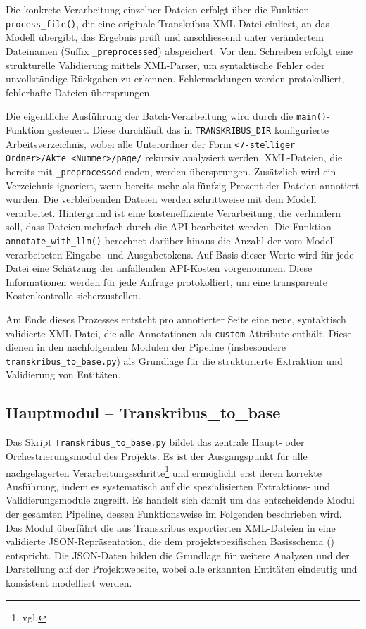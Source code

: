 \documentclass[12pt, a4paper, ngerman, bidi=default]{article}
\newcommand{\code}[1]{\colorbox{VeryLightGray}{\texttt{#1}}} %
\begin{document}
Die konkrete Verarbeitung einzelner Dateien erfolgt über die Funktion \code{process\_file()}, die eine originale Transkribus-XML-Datei einliest,
an das Modell übergibt, das Ergebnis prüft und anschliessend unter verändertem Dateinamen (Suffix \code{\_preprocessed}) abspeichert. Vor dem 
Schreiben erfolgt eine strukturelle Validierung mittels XML-Parser, um syntaktische Fehler oder unvollständige Rückgaben zu 
erkennen. Fehlermeldungen werden protokolliert, fehlerhafte Dateien übersprungen.

Die eigentliche Ausführung der Batch-Verarbeitung wird durch die \code{main()}-Funktion gesteuert. Diese durchläuft das in 
\code{TRANSKRIBUS\_DIR} konfigurierte Arbeitsverzeichnis, wobei alle Unterordner der Form \code{<7-stelliger Ordner>/Akte\_<Nummer>/page/} 
rekursiv analysiert werden. XML-Dateien, die bereits mit \code{\_preprocessed} enden, werden übersprungen. Zusätzlich wird ein Verzeichnis 
ignoriert, wenn bereits mehr als fünfzig Prozent der Dateien annotiert wurden. Die verbleibenden Dateien werden schrittweise mit dem Modell 
verarbeitet. Hintergrund ist eine kosteneffiziente Verarbeitung, die verhindern soll, dass Dateien mehrfach durch die API bearbeitet werden. Die Funktion 
\code{annotate\_with\_llm()} berechnet darüber hinaus die Anzahl der vom Modell verarbeiteten Eingabe- und Ausgabetokens. Auf Basis dieser Werte wird für 
jede Datei eine Schätzung der anfallenden API-Kosten vorgenommen. Diese Informationen werden für jede Anfrage protokolliert, um eine transparente 
Kostenkontrolle sicherzustellen.

Am Ende dieses Prozesses entsteht pro annotierter Seite eine neue, syntaktisch validierte XML-Datei, 
die alle Annotationen als \code{custom}-Attribute enthält. Diese dienen in den nachfolgenden Modulen der 
Pipeline (insbesondere \code{transkribus\_to\_base.py}) als Grundlage für die strukturierte Extraktion und Validierung von Entitäten.


\subsection{Hauptmodul -- Transkribus\_to\_base}\label{sec:transkribus_to_base}


Das Skript \code{Transkribus\_to\_base.py} bildet das zentrale Haupt- oder Orchestrierungsmodul des Projekts. Es ist der Ausgangspunkt für alle nachgelagerten Verarbeitungsschritte\footnote{vgl. } und ermöglicht erst deren korrekte Ausführung, indem es systematisch auf die spezialisierten Extraktions- und Validierungsmodule zugreift. Es handelt sich damit um das entscheidende Modul der gesamten Pipeline, dessen Funktionsweise im Folgenden beschrieben wird.
Das Modul überführt die aus Transkribus exportierten XML-Dateien in eine validierte JSON-Repräsentation, die dem projektspezifischen Basisschema () entspricht. Die JSON-Daten bilden die Grundlage für weitere Analysen und der Darstellung auf der Projektwebsite, wobei alle erkannten Entitäten eindeutig und konsistent modelliert werden.
\end{document}
